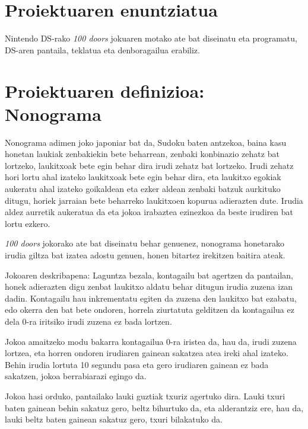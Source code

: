 \documentclass[dvipsnames]{../../../../AritzhClass}
\author{Aritz Lopez, Iñigo Arnedo eta Elena Hernández}
\begin{document}
\izenburuorrialdea

\tableofcontents

\pagebreak

\section{Proiektuaren enuntziatua}

Nintendo DS-rako \textit{100 doors} jokuaren motako ate bat diseinatu eta programatu, DS-aren pantaila, teklatua eta denboragailua erabiliz.

\section{Proiektuaren definizioa: Nonograma}

Nonograma adimen joko japoniar bat da, Sudoku baten antzekoa, baina kasu honetan laukiak zenbakiekin bete beharrean, zenbaki konbinazio zehatz bat lortzeko, laukitxoak bete egin behar dira irudi zehatz bat lortzeko. Irudi zehatz hori lortu ahal izateko laukitxoak bete egin behar dira, eta laukitxo egokiak aukeratu ahal izateko goikaldean eta ezker aldean zenbaki batzuk aurkituko ditugu, horiek jarraian bete beharreko laukitxoen kopurua adierazten dute. Irudia aldez aurretik aukeratua da eta jokoa irabaztea ezinezkoa da beste irudiren bat lortu ezkero. 

\textit{100 doors} jokorako ate bat diseinatu behar genuenez, nonograma honetarako irudia giltza bat izatea adostu genuen, honen bitartez irekitzen baitira ateak. 

Jokoaren deskribapena:
Laguntza bezala, kontagailu bat agertzen da pantailan, honek adierazten digu zenbat laukitxo aldatu behar ditugun irudia zuzena izan dadin. Kontagailu hau inkrementatu egiten da zuzena den laukitxo bat ezabatu, edo okerra den bat bete ondoren, horrela ziurtatuta gelditzen da kontagailua ez dela 0-ra iritsiko irudi zuzena ez bada lortzen. 

Jokoa amaitzeko modu bakarra kontagailua 0-ra iristea da, hau da, irudi zuzena lortzea, eta horren ondoren irudiaren gainean sakatzea atea ireki ahal izateko. Behin irudia lortuta 10 segundu pasa eta gero irudiaren gainean ez bada sakatzen, jokoa berrabiarazi egingo da.

Jokoa hasi orduko, pantailako lauki guztiak txuriz agertuko dira. Lauki txuri baten gainean behin sakatuz gero, beltz bihurtuko da, eta alderantziz ere, hau da, lauki beltz baten gainean sakatuz gero, txuri bilakatuko da. 
\end{document}
